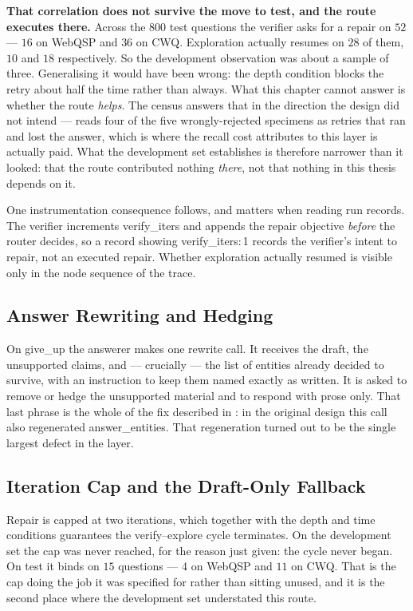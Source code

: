 \textbf{That correlation does not survive the move to test, and the route
executes there.} Across the $800$ test questions the verifier asks for a
repair on $52$ --- $16$ on WebQSP and $36$ on CWQ. Exploration actually
resumes on $28$ of them, $10$ and $18$ respectively. So the development
observation was about a sample of three. Generalising it would have been
wrong: the depth condition blocks the retry about half the time rather than
always. What this chapter cannot answer is whether the route \emph{helps}.
The census answers that in the direction the design did not intend ---
 reads four of the five wrongly-rejected specimens
as retries that ran and lost the answer, which is where the recall cost
 attributes to this layer is actually paid.
What the development set establishes is therefore narrower than it looked:
that the route contributed nothing \emph{there}, not that nothing in this
thesis depends on it.

One instrumentation consequence follows, and matters when reading run records.
The verifier increments \textsf{verify\_iters} and appends the repair objective
\emph{before} the router decides, so a record showing \textsf{verify\_iters:\,1}
records the verifier's intent to repair, not an executed repair. Whether
exploration actually resumed is visible only in the node sequence of the trace.

\subsection{Answer Rewriting and Hedging}

On \textsf{give\_up} the answerer makes one rewrite call. It receives the draft,
the unsupported claims, and --- crucially --- the list of entities already
decided to survive, with an instruction to keep them named exactly as written.
It is asked to remove or hedge the unsupported material and to respond with
prose only. That last phrase is the whole of the fix described in
: in the original design this call also regenerated
\textsf{answer\_entities}. That regeneration turned out to be the single
largest defect in the layer.

\subsection{Iteration Cap and the Draft-Only Fallback}

Repair is capped at two iterations, which together with the depth and
time conditions guarantees the verify--explore cycle
terminates. On the development set the cap was never reached, for the reason
just given: the cycle never began. On test it binds on $15$ questions --- $4$ on
WebQSP and $11$ on CWQ. That is the cap doing the job it was specified for
rather than sitting unused, and it is the second place where the development
set understated this route.


